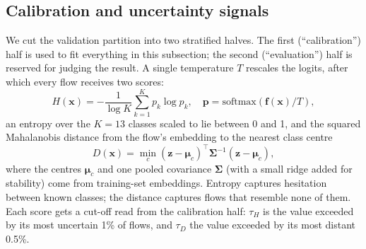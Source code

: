 \documentclass[conference]{IEEEtran}
\begin{document}
\subsection{Calibration and uncertainty signals}
We cut the validation partition into two stratified halves. The first (``calibration'') half is
used to fit everything in this subsection; the second (``evaluation'') half is reserved for
judging the result. A single temperature $T$ \cite{guo2017calibration} rescales the logits, after
which every flow receives two scores:
\begin{equation}
H(\mathbf{x}) = -\frac{1}{\log K}\sum_{k=1}^{K} p_k \log p_k, \quad
\mathbf{p} = \mathrm{softmax}(\mathbf{f}(\mathbf{x})/T),
\end{equation}
an entropy over the $K=13$ classes scaled to lie between 0 and 1, and the squared Mahalanobis
distance from the flow's embedding to the nearest class centre \cite{lee2018simple}
\begin{equation}
D(\mathbf{x}) = \min_{c} (\mathbf{z}-\boldsymbol{\mu}_c)^\top \boldsymbol{\Sigma}^{-1} (\mathbf{z}-\boldsymbol{\mu}_c),
\end{equation}
where the centres $\boldsymbol{\mu}_c$ and one pooled covariance $\boldsymbol{\Sigma}$ (with a
small ridge added for stability) come from training-set embeddings. Entropy captures hesitation
between known classes; the distance captures flows that resemble none of them. Each score gets a
cut-off read from the calibration half: $\tau_H$ is the value exceeded by its most uncertain 1\%
of flows, and $\tau_D$ the value exceeded by its most distant 0.5\%.
\end{document}
